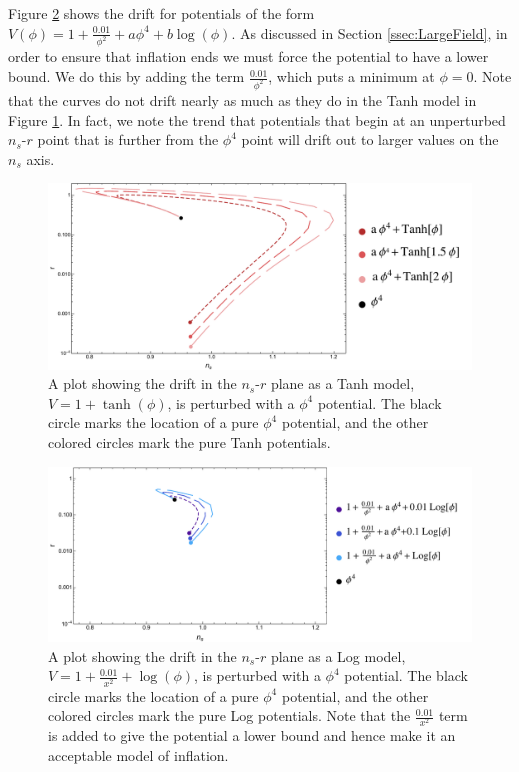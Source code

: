 \documentclass[a4paper,11pt]{article}
\def\nsr{$n_s$-$r$ }
\begin{document}
Figure \ref{fig:LFP_Log_drift} shows the drift for potentials of the form $V(\phi)=1+\tfrac{0.01}{\phi^2}+a\phi^4+b\log(\phi)$. As discussed in Section \ref{ssec:LargeField}, in order to ensure that inflation ends we must force the potential to have a lower bound. We do this by adding the term $\tfrac{0.01}{\phi^2}$, which puts a minimum at $\phi=0$. Note that the curves do not drift nearly as much as they do in the Tanh model in Figure \ref{fig:LFP_Tanh_drift}. In fact, we note the trend that potentials that begin at an unperturbed \nsr point that is further from the $\phi^4$ point will drift out to larger values on the $n_s$ axis. 

\begin{figure}[H]
	\centering
	\includegraphics[width=\textwidth]{figures/LFP_lines_Tanh_final.pdf}
	\caption[Drift in \nsr plane for Tanh model with perturbations.]{A plot showing the drift in the \nsr plane as a Tanh model, $V=1+\tanh(\phi)$, is perturbed with a $\phi^4$ potential. The black circle marks the location of a pure $\phi^4$ potential, and the other colored circles mark the pure Tanh potentials.}
	\label{fig:LFP_Tanh_drift}
\end{figure}

\begin{figure}[H]
	\centering
	\includegraphics[width=\textwidth]{figures/LFP_lines_Log_final.pdf}
	\caption[Drift in \nsr plane for Log model with perturbations.]{A plot showing the drift in the \nsr plane as a Log model, $V=1+\tfrac{0.01}{x^2}+\log(\phi)$, is perturbed with a $\phi^4$ potential. The black circle marks the location of a pure $\phi^4$ potential, and the other colored circles mark the pure Log potentials. Note that the $\tfrac{0.01}{x^2}$ term is added to give the potential a lower bound and hence make it an acceptable model of inflation.}
	\label{fig:LFP_Log_drift}
\end{figure}
\end{document}
